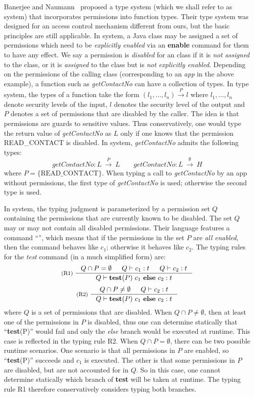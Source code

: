 Banerjee and Naumann~\cite{Banerjee:2005ht} proposed a type system (which we shall refer to as {\BN} system)
that incorporates permissions into function types.
Their type system was designed for an access control mechanism different from ours,
but the basic principles are still applicable.
In {\BN} system, a Java class may be assigned a set of permissions which need to be {\em explicitly enabled} via an \textbf{enable} command for them to have any effect.
We say a permission is {\em disabled} for an class if it is \emph{not assigned} to the class, or it is \emph{assigned} to the class but is \emph{not explicitly enabled}.
Depending on the permissions of
the calling class (corresponding to an \emph{app} in the above example), a function such as \textit{getContactNo} can have a collection of types. In {\BN} type system, the types of a function take
the form $(l_1,\dots, l_n)\xrightarrow{~P~}l$
where $l_1,\dots,l_n$ denote security levels of the input, $l$ denotes the security level of the output
and $P$ denotes a set of permissions that are disabled by the caller.
The idea is that permissions are guards to sensitive values. Thus conservatively, one would type the return value of \textit{getContactNo} as $L$ only if
one knows that the permission READ\_CONTACT is disabled.
In {\BN} system, \textit{getContactNo} admits the following types:
\begin{equation*}
\textit{getContactNo} : L~\xrightarrow{~P~}~L\qquad
\textit{getContactNo} : L~\xrightarrow{~\emptyset~}~H
\end{equation*}
where $P = \{ \mathrm{READ\_CONTACT} \}.$
When typing a call to \textit{getContactNo} by
an app without permissions,
the first type of \textit{getContactNo} is used; otherwise
the second type is used.

In {\BN} system, the typing judgment is parameterized
by a permission set $Q$ containing the permissions that are
currently known to be disabled. The set $Q$ may or may not contain all disabled permissions.
Their language features a command ``'', which
means that if the permissions in the set $P$ are \emph{all enabled}, then
the command behaves like $c_1$; otherwise it behaves like $c_2$.
The typing rules for the \textit{test} command (in a much
simplified form) are:
\[
\inference[(R1)~]{
Q \cap P = \emptyset & Q |- c_1 : t & Q \vdash {c_2} : t
}
{
Q \vdash \lcCP{P}{c_1}{c_2} : t
}
\]
\[
\inference[(R2)~]{
Q \cap P \not = \emptyset & Q \vdash c_2 : t
}
{
Q \vdash \lcCP{P}{c_1}{c_2} : t
}
\]
where $Q$ is a set of permissions that are disabled.
When $Q \cap P \not = \emptyset$, then
at least one of the permissions in $P$ is disabled, thus
one can determine statically that ``\textbf{test}(P)'' would fail and only the \emph{else} branch would be executed at runtime. This case is
reflected in the typing rule R2.
When $Q \cap P = \emptyset$, there can be two possible runtime scenarios.
One scenario is that all permissions in $P$ are enabled, so ``\textbf{test}(P)'' succeeds and $c_1$ is executed.
The other is that some permissions in $P$ are disabled, but are not accounted for in $Q$.
So in this case, one cannot determine statically which branch of \textbf{test} will be
taken at runtime. The typing rule R1 therefore conservatively considers typing both branches.

